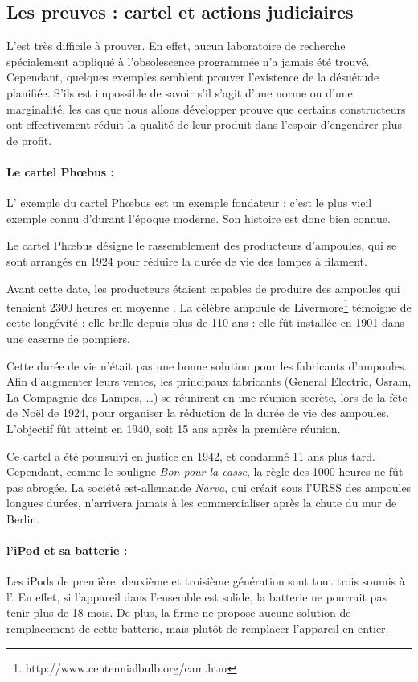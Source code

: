 \subsection{Les preuves : cartel et actions judiciaires}
\label{c1/s1/ss1:preuve_op}

L'\op est très difficile à prouver. En effet, aucun laboratoire de recherche spécialement appliqué à l'obsolescence programmée n'a jamais été trouvé. Cependant, quelques exemples semblent prouver l'existence de la désuétude planifiée. S'ils est impossible de savoir s'il s'agit d'une norme ou d'une marginalité, les cas que nous allons développer prouve que certains constructeurs ont effectivement réduit la qualité de leur produit dans l'espoir d'engendrer plus de profit. 

\paragraph*{Le cartel Phœbus : } L' exemple du cartel Phœbus est un exemple fondateur : c'est le plus vieil exemple connu d'\op durant l'époque moderne. Son histoire est donc bien connue. 

Le cartel Phœbus désigne le rassemblement des producteurs d'ampoules, qui se sont arrangés en 1924 pour réduire la durée de vie des lampes à filament. 

Avant cette date, les producteurs étaient capables de produire des ampoules qui tenaient 2300 heures en moyenne \cite{opes_PHOEBUS}. La célèbre ampoule de Livermore\footnote{http://www.centennialbulb.org/cam.htm} témoigne de cette longévité : elle brille depuis plus de 110 ans : elle fût installée en 1901 dans une caserne de pompiers. 

Cette durée de vie n'était pas une bonne solution pour les fabricants d'ampoules. Afin d'augmenter leurs ventes, les principaux fabricants (General Electric, Osram, La Compagnie des Lampes, \dots) se réunirent en une réunion secrète, lors de la fête de Noël de 1924, pour organiser la  réduction de la durée de vie des ampoules. L'objectif fût atteint  en 1940, soit 15 ans après la première réunion. 

Ce cartel a été poursuivi en justice en 1942, et condamné 11 ans plus tard. Cependant, comme le souligne \textit{Bon pour la casse}, la règle des 1000 heures ne fût pas abrogée. La société est-allemande \textit{Narva}, qui créait sous l'URSS des ampoules longues durées, n'arrivera jamais à les commercialiser après la chute du mur de Berlin. 

\paragraph*{l'iPod et sa batterie : } Les iPods de première, deuxième et troisième génération sont tout trois soumis à l'\op. En effet, si l'appareil dans l'ensemble est solide, la batterie ne pourrait pas tenir plus de 18 mois\cite{cec-zevRapportObsProg}. De plus, la firme ne propose aucune solution de remplacement de cette batterie, mais plutôt de remplacer l'appareil en entier. 

